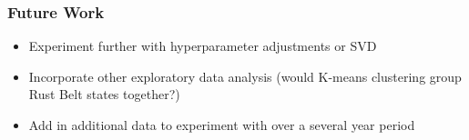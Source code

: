 \documentclass{beamer}
\begin{document}
\begin{frame}

    \frametitle{Future Work}
    \begin{itemize}
      \item Experiment further with hyperparameter adjustments or SVD
      \item Incorporate other exploratory data analysis (would K-means clustering group Rust Belt states together?)
      \item Add in additional data to experiment with over a several year period
    \end{itemize}


\end{frame}
\end{document}
